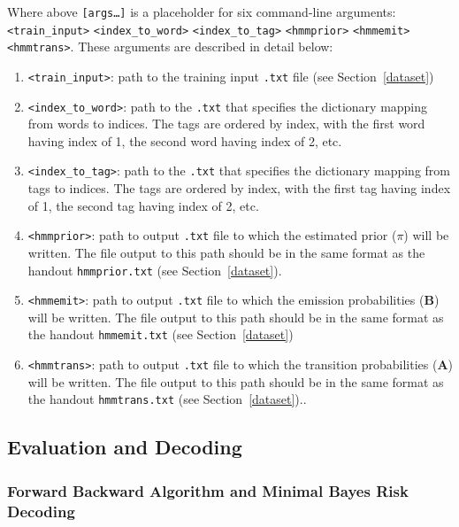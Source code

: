 \documentclass{article}
\begin{document}
Where above \texttt{[args\dots]} is a placeholder for six command-line arguments:\texttt{<train\_input>} \texttt{<index\_to\_word>} \texttt{<index\_to\_tag>} \texttt{<hmmprior>} \texttt{<hmmemit>} \texttt{<hmmtrans>}. These arguments are described in detail below:
\begin{enumerate}
    \item \texttt{<train\_input>}: path to the training input \texttt{.txt} file (see Section~\ref{dataset})
    \item \texttt{<index\_to\_word>}: path to the \texttt{.txt} that specifies the dictionary mapping from words to indices. The tags are ordered by index, with the first word having index of 1, the second word having index of 2, etc.
    \item \texttt{<index\_to\_tag>}: path to the \texttt{.txt} that specifies the dictionary mapping from tags to indices. The tags are ordered by index, with the first tag having index of 1, the second tag having index of 2, etc.
    \item \texttt{<hmmprior>}: path to output \texttt{.txt} file to which the estimated prior (\boldmath${\pi}$) will be written. The file output to this path should be in the same format as the handout \texttt{hmmprior.txt} (see Section~\ref{dataset}).
    \item \texttt{<hmmemit>}: path to output \texttt{.txt} file to which the emission probabilities ($\mathbf B$) will be written. The file output to this path should be in the same format as the handout \texttt{hmmemit.txt} (see Section~\ref{dataset})
    \item \texttt{<hmmtrans>}: path to output \texttt{.txt} file to which the transition probabilities ($\mathbf A$) will be written. The file output to this path should be in the same format as the handout \texttt{hmmtrans.txt} (see Section~\ref{dataset})..
\end{enumerate}


\subsection{Evaluation and Decoding}
\label{forback}

\subsubsection{Forward Backward Algorithm and Minimal Bayes Risk Decoding}
\end{document}
